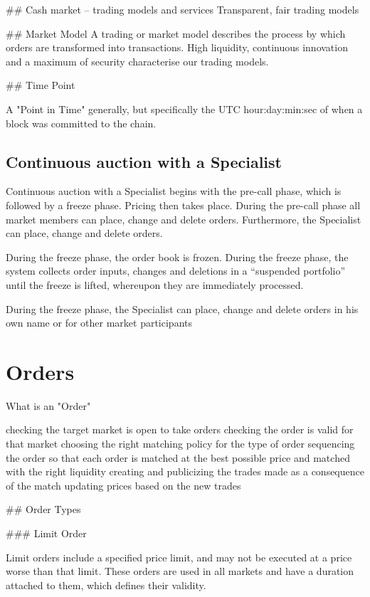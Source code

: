 \documentclass{article}
\begin{document}
##
Cash market – trading models and services
Transparent, fair trading models

## Market Model
A trading or market model describes the process by which orders are transformed into transactions. High liquidity, continuous innovation and a maximum of security characterise our trading models.

## Time Point

A "Point in Time" generally, but specifically the UTC hour:day:min:sec of when a block was committed to the chain. 

\subsection{ Continuous auction with a Specialist }
Continuous auction with a Specialist begins with the pre-call phase, which is followed by a freeze phase. Pricing then takes place. During the pre-call phase all market members can place, change and delete orders. Furthermore, the Specialist can place, change and delete orders.

During the freeze phase, the order book is frozen. During the freeze phase, the system collects order inputs, changes and deletions in a “suspended portfolio” until the freeze is lifted, whereupon they are immediately processed.

During the freeze phase, the Specialist can place, change and delete orders in his own name or for other market participants


\section{Orders}

What is an "Order"

checking the target market is open to take orders
checking the order is valid for that market
choosing the right matching policy for the type of order
sequencing the order so that each order is matched at the best possible price and matched with the right liquidity
creating and publicizing the trades made as a consequence of the match
updating prices based on the new trades


## Order Types

### Limit Order

Limit orders include a specified price limit, and may not be executed at a price worse than that limit. These orders are used in all markets and have a duration attached to them, which defines their validity.
\end{document}
